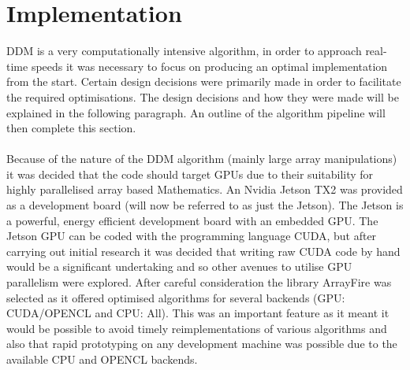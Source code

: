 \documentclass[11pt]{article}
\begin{document}
\clearpage
\section{Implementation}
DDM is a very computationally intensive algorithm, in order to approach real-time speeds it was necessary to focus on producing an optimal implementation from the start. Certain design decisions were primarily made in order to facilitate the required optimisations. The design decisions and how they were made will be explained in the following paragraph. An outline of the algorithm pipeline will then complete this section.
\\\\
Because of the nature of the DDM algorithm (mainly large array manipulations) it was decided that the code should target GPUs due to their suitability for highly parallelised array based Mathematics. An Nvidia Jetson TX2 was provided as a development board (will now be referred to as just the Jetson). The Jetson is a powerful, energy efficient development board with an embedded GPU\cite{jetson}. The Jetson GPU can be coded with the programming language CUDA, but after carrying out initial research \cite{cuda_book} it was decided that writing raw CUDA code by hand would be a significant undertaking and so other avenues to utilise GPU parallelism were explored. After careful consideration the library ArrayFire was selected as it offered optimised algorithms for several backends (GPU: CUDA/OPENCL and CPU: All)\cite{arrayfire}. This was an important feature as it meant it would be possible to avoid timely reimplementations of various algorithms and also that rapid prototyping on any development machine was possible due to the available CPU and OPENCL backends.
\\\\
\end{document}
